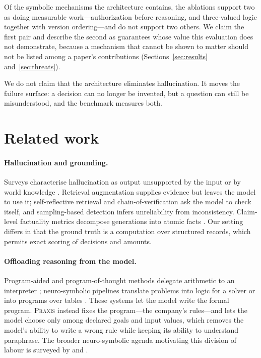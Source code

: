 \documentclass[11pt]{article}
\begin{document}
Of the symbolic mechanisms the architecture contains, the ablations support two as doing
measurable work---authorization before reasoning, and three-valued logic together with
version ordering---and do not support two others. We claim the first pair and describe the
second as guarantees whose value this evaluation does not demonstrate, because a mechanism
that cannot be shown to matter should not be listed among a paper's contributions
(Sections~\ref{sec:results} and~\ref{sec:threats}).

We do not claim that the architecture eliminates hallucination. It moves the failure
surface: a decision can no longer be invented, but a question can still be misunderstood,
and the benchmark measures both.

\section{Related work}

\paragraph{Hallucination and grounding.} Surveys characterise hallucination as output
unsupported by the input or by world knowledge \citep{ji2023survey,huang2025survey}.
Retrieval augmentation \citep{lewis2020rag} supplies evidence but leaves the model to use
it; self-reflective retrieval \citep{asai2024selfrag} and chain-of-verification
\citep{dhuliawala2024cove} ask the model to check itself, and sampling-based detection
\citep{manakul2023selfcheckgpt} infers unreliability from inconsistency. Claim-level
factuality metrics decompose generations into atomic facts \citep{min2023factscore}. Our
setting differs in that the ground truth is a computation over structured records, which
permits exact scoring of decisions and amounts.

\paragraph{Offloading reasoning from the model.} Program-aided and program-of-thought
methods delegate arithmetic to an interpreter \citep{gao2023pal,chen2023pot}; neuro-symbolic
pipelines translate problems into logic for a solver \citep{olausson2023linc,pan2023logiclm}
or into programs over tables \citep{cheng2023binder}. These systems let the model write the
formal program. \textsc{Praxis} instead fixes the program---the company's rules---and lets the
model choose only among declared goals and input values, which removes the model's
ability to write a wrong rule while keeping its ability to understand paraphrase. The
broader neuro-symbolic agenda motivating this division of labour is surveyed by
\citet{garcez2023neurosymbolic} and \citet{kautz2022third}.
\end{document}
